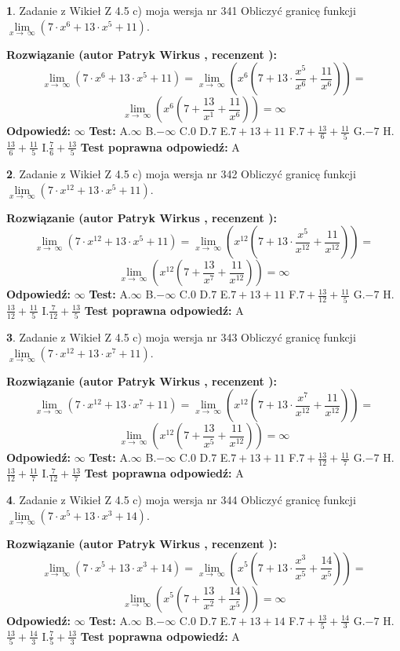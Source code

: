 \documentclass[12pt, a4paper]{article}
\theoremstyle{definition} %
\newtheorem{zad}{}
\newcommand{\zadStart}[1]{\begin{zad}#1\newline}
\newcommand{\zadStop}{\end{zad}}
\newcommand{\rozwStart}[2]{\noindent \textbf{Rozwiązanie (autor #1 , recenzent #2): }\newline}
\newcommand{\rozwStop}{\newline}
\newcommand{\odpStart}{\noindent \textbf{Odpowiedź:}\newline}
\newcommand{\odpStop}{\newline}
\newcommand{\testStart}{\noindent \textbf{Test:}\newline}
\newcommand{\testStop}{\newline}
\newcommand{\kluczStart}{\noindent \textbf{Test poprawna odpowiedź:}\newline}
\newcommand{\kluczStop}{\newline}
\begin{document}
\zadStart{Zadanie z Wikieł Z 4.5 c) moja wersja nr 341}
Obliczyć granicę funkcji  $\lim\limits_{x\to\ \infty}(7 \cdot x^{6}+13 \cdot x^{5}+11)$.
\zadStop
\rozwStart{Patryk Wirkus}{}
$$\lim\limits_{x\to\ \infty}(7 \cdot x^{6}+13 \cdot x^{5}+11) = \lim\limits_{x\to\ \infty}(x^{6}(7 +13 \cdot \frac{x^{5}}{x^{6}}+\frac{11}{x^{6}})) =$$ $$\lim\limits_{x\to\ \infty}(x^{6}(7 +\frac{13}{x^{1}}+\frac{11}{x^{6}})) =\infty$$
\rozwStop
\odpStart
$\infty$
\odpStop
\testStart
A.$\infty$ B.$-\infty$ C.$0$ D.$7$ E.$7 + 13 + 11$
F.$7+\frac{13}{6}+\frac{11}{5}$ G.$-7$
H.$\frac{13}{6}+\frac{11}{5}$
I.$\frac{7}{6}+\frac{13}{5}$
\testStop
\kluczStart
A
\kluczStop



\zadStart{Zadanie z Wikieł Z 4.5 c) moja wersja nr 342}
Obliczyć granicę funkcji  $\lim\limits_{x\to\ \infty}(7 \cdot x^{12}+13 \cdot x^{5}+11)$.
\zadStop
\rozwStart{Patryk Wirkus}{}
$$\lim\limits_{x\to\ \infty}(7 \cdot x^{12}+13 \cdot x^{5}+11) = \lim\limits_{x\to\ \infty}(x^{12}(7 +13 \cdot \frac{x^{5}}{x^{12}}+\frac{11}{x^{12}})) =$$ $$\lim\limits_{x\to\ \infty}(x^{12}(7 +\frac{13}{x^{7}}+\frac{11}{x^{12}})) =\infty$$
\rozwStop
\odpStart
$\infty$
\odpStop
\testStart
A.$\infty$ B.$-\infty$ C.$0$ D.$7$ E.$7 + 13 + 11$
F.$7+\frac{13}{12}+\frac{11}{5}$ G.$-7$
H.$\frac{13}{12}+\frac{11}{5}$
I.$\frac{7}{12}+\frac{13}{5}$
\testStop
\kluczStart
A
\kluczStop



\zadStart{Zadanie z Wikieł Z 4.5 c) moja wersja nr 343}
Obliczyć granicę funkcji  $\lim\limits_{x\to\ \infty}(7 \cdot x^{12}+13 \cdot x^{7}+11)$.
\zadStop
\rozwStart{Patryk Wirkus}{}
$$\lim\limits_{x\to\ \infty}(7 \cdot x^{12}+13 \cdot x^{7}+11) = \lim\limits_{x\to\ \infty}(x^{12}(7 +13 \cdot \frac{x^{7}}{x^{12}}+\frac{11}{x^{12}})) =$$ $$\lim\limits_{x\to\ \infty}(x^{12}(7 +\frac{13}{x^{5}}+\frac{11}{x^{12}})) =\infty$$
\rozwStop
\odpStart
$\infty$
\odpStop
\testStart
A.$\infty$ B.$-\infty$ C.$0$ D.$7$ E.$7 + 13 + 11$
F.$7+\frac{13}{12}+\frac{11}{7}$ G.$-7$
H.$\frac{13}{12}+\frac{11}{7}$
I.$\frac{7}{12}+\frac{13}{7}$
\testStop
\kluczStart
A
\kluczStop



\zadStart{Zadanie z Wikieł Z 4.5 c) moja wersja nr 344}
Obliczyć granicę funkcji  $\lim\limits_{x\to\ \infty}(7 \cdot x^{5}+13 \cdot x^{3}+14)$.
\zadStop
\rozwStart{Patryk Wirkus}{}
$$\lim\limits_{x\to\ \infty}(7 \cdot x^{5}+13 \cdot x^{3}+14) = \lim\limits_{x\to\ \infty}(x^{5}(7 +13 \cdot \frac{x^{3}}{x^{5}}+\frac{14}{x^{5}})) =$$ $$\lim\limits_{x\to\ \infty}(x^{5}(7 +\frac{13}{x^{2}}+\frac{14}{x^{5}})) =\infty$$
\rozwStop
\odpStart
$\infty$
\odpStop
\testStart
A.$\infty$ B.$-\infty$ C.$0$ D.$7$ E.$7 + 13 + 14$
F.$7+\frac{13}{5}+\frac{14}{3}$ G.$-7$
H.$\frac{13}{5}+\frac{14}{3}$
I.$\frac{7}{5}+\frac{13}{3}$
\testStop
\kluczStart
A
\kluczStop
\end{document}
